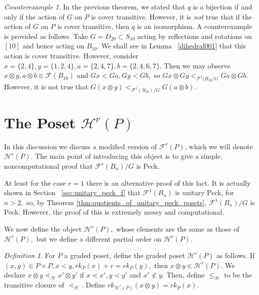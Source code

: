 \documentclass{amsart}
\theoremstyle{remark}
\newtheorem{counterexample}[thm]{Counterexample}
\newtheorem{defn}[thm]{Definition}
\begin{document}
\begin{counterexample}
In the previous theorem, we stated that $q$ is a bijection if and only if the action of $G$ on $P$ is cover transitive. However, it is {\it not} true that if the action of $G$ on $P$ is cover transitive, then $q$ is an isomorphism. A counterexample is provided as follows. Take $G=D_{20} \subset S_{10}$ acting by reflections and rotations on $[10]$ and hence acting on $B_{10}.$ We shall see in Lemma ~\ref{dihedral001} that this action is cover transitive. However, consider $x = \{2,4\},y = \{1,2,4\},a = \{2,4,7\},b = \{2,4,6,7\}.$ Then we may observe $x \otimes y,a \otimes b \in \mathcal F(B_{10})$ and $Gx < Ga, Gy < Gb,$ so $Gx \otimes Gy <_{\mathcal F^1(B_{10}/G} Ga \otimes Gb.$ However, it is not true that $G(x\otimes y)<_{\mathcal F^1(B_{10})/G} G(a\otimes b).$
\end{counterexample}

\section{The Poset $\mathcal{H}^r(P)$}
In this discussion we discuss a modified version of $\mathcal{F}^r(P)$, which we will denote $\mathcal{H}^r(P)$. The main point of introducing this object is to give a simple, noncomputational proof that $\mathcal F^r(B_n)/G$ is Peck. 

At least for the case $r=1$ there is an alternative proof of this fact. It is actually shown in Section ~\ref{sec:unitary_peck_f} that $\mathcal F^1(B_n)$ is unitary Peck, for $n>2,$ so, by Theorem \ref{thm:quotients_of_unitary_peck_posets}, $\mathcal F^1(B_n)/G$ is Peck. However, the proof of this is extremely messy and computational.


We now define the object $\mathcal H^r(P),$ whose elements are the same as those of $\mathcal{H}^r(P),$ but we define a different partial order on $\mathcal{H}^r(P)$.

\begin{defn}
\label{defn:h_map}
For $P$ a graded poset, define the graded poset $\mathcal H^r(P)$ as follows. If $(x,y) \in P\times P,x <y,rk_P(x) + r = rk_P(y),$ then $x \otimes y \in \mathcal H^r(P).$ We declare $x\otimes y \lessdot_{\mathcal H} x' \otimes y'$ if $x \lessdot x',y\lessdot y'$ and $x' \not < y.$ Then, define $\leq_{\mathcal H}$ to be the transitive closure of $\lessdot_{\mathcal H}.$ Define $rk_{\mathcal H^r(P)}(x\otimes y) = rk_P(x).$
\end{defn}
\end{document}
